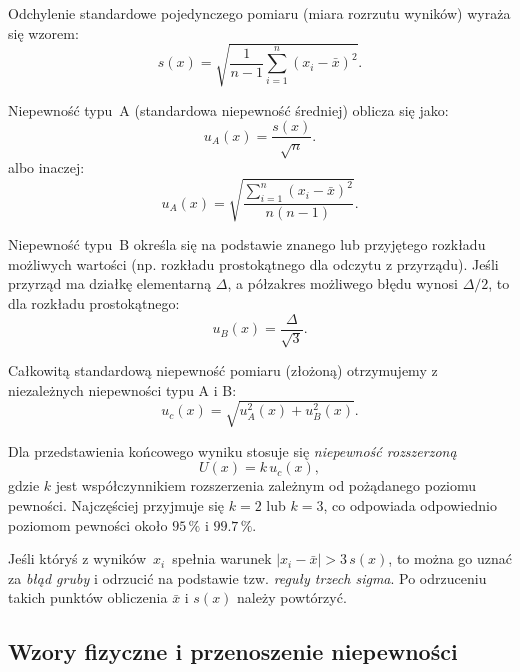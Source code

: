 \documentclass{fizykalab}
\begin{document}
Odchylenie standardowe pojedynczego pomiaru (miara rozrzutu wyników)
wyraża się wzorem:
\begin{equation}
  s(x) = \sqrt{\frac{1}{n-1}\sum_{i=1}^{n}
  \left(x_i - \bar{x}\right)^2 }.
\end{equation}

Niepewność typu~A (standardowa niepewność średniej) oblicza się jako:
\begin{equation}
  u_A(x) = \frac{s(x)}{\sqrt{n}}.
\end{equation}
\indent
albo inaczej:
\begin{equation}
  u_A(x) = \sqrt{\frac{\sum_{i=1}^{n} \left(x_i - \bar{x}\right)^2 }{n(n-1)}}.
\end{equation}

\vspace{1em}
Niepewność typu~B określa się na podstawie znanego lub przyjętego
rozkładu możliwych wartości (np. rozkładu prostokątnego dla odczytu
z przyrządu).
Jeśli przyrząd ma działkę elementarną \(\Delta\),
a półzakres możliwego błędu wynosi \(\Delta/2\),
to dla rozkładu prostokątnego:
\begin{equation}
  u_B(x) = \frac{\Delta}{\sqrt{3}}.
\end{equation}

Całkowitą standardową niepewność pomiaru (złożoną)
otrzymujemy z niezależnych niepewności typu A i B:
\begin{equation}
  u_c(x) = \sqrt{u_A^2(x) + u_B^2(x)}.
\end{equation}

Dla przedstawienia końcowego wyniku stosuje się
\emph{niepewność rozszerzoną}
\begin{equation}
  U(x) = k\,u_c(x),
\end{equation}
gdzie \( k \) jest współczynnikiem rozszerzenia zależnym od
pożądanego poziomu pewności.
Najczęściej przyjmuje się \( k = 2 \) lub \( k = 3 \), co odpowiada
odpowiednio poziomom pewności około \(95\,\%\) i \(99.7\,\%\).

\vspace{1em}
Jeśli któryś z wyników \(\,x_i\,\) spełnia warunek
\(|x_i - \bar{x}| > 3\,s(x)\),
to można go uznać za \emph{błąd gruby}
i odrzucić na podstawie tzw. \emph{reguły trzech sigma}.
Po odrzuceniu takich punktów obliczenia \(\bar{x}\)
i \(s(x)\) należy powtórzyć.

\subsection{Wzory fizyczne i przenoszenie niepewności}
\end{document}
